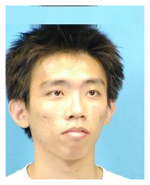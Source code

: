 \documentclass[10pt,twocolumn,letterpaper]{article}
\begin{document}
\begin{figure}[htbp]
{\begin{minipage}[b]{0.22\linewidth}
\includegraphics[width=0.99\linewidth]{img/light&pose_invariance/p2.jpg}
\end{minipage}
}
\end{figure}
\end{document}
